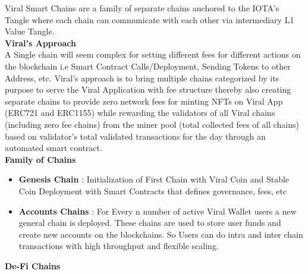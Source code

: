 \documentclass[conference]{IEEEtran}
\begin{document}
Viral Smart Chains are a family of separate chains anchored to the IOTA's Tangle where each chain can communicate with each other via intermediary L1 Value Tangle.\\

\textbf{Viral's Approach}\\

A Single chain will seem complex for setting different fees for different actions on the blockchain i.e Smart Contract Calls/Deployment, Sending Tokens to other Address, etc. Viral's approach is to bring multiple chains categorized by its purpose to serve the Viral Application with fee structure thereby also creating separate chains to provide zero network fees for minting NFTs on Viral App (ERC721 and ERC1155) while rewarding the validators of all Viral chains (including zero fee chains) from the miner pool (total collected fees of all chains) based on validator's total validated transactions for the day through an automated smart contract.\\

\textbf{Family of Chains}\\

\begin{itemize}[wide, labelwidth=!, labelindent=0pt]
\item \textbf{Genesis Chain} : Initialization of First Chain with Viral Coin and Stable Coin Deployment with Smart Contracts that defines governance, fees, etc\\

\item \textbf{Accounts Chains} : For Every n number of active Viral Wallet users a new general chain is deployed. These chains are used to store user funds and create new accounts on the blockchains. So Users can do intra and inter chain transactions with high throughput and flexible scaling.\\
\end{itemize}

\textbf{De-Fi Chains}\\
\end{document}
